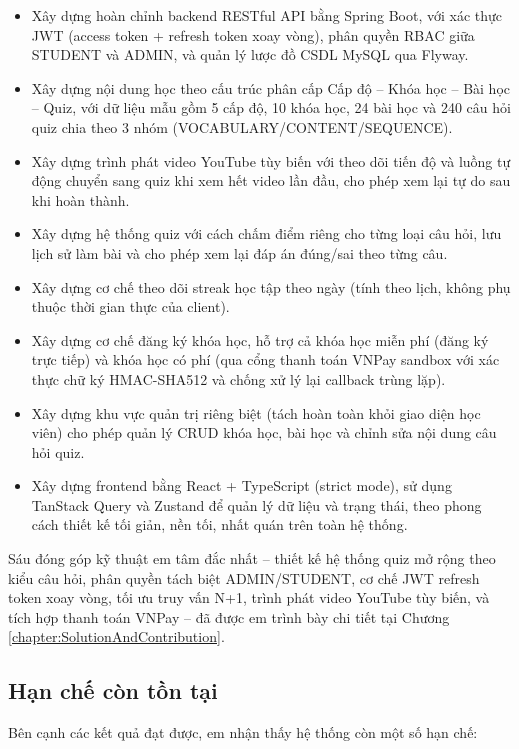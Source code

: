 \documentclass[../DoAn.tex]{subfiles}
\begin{document}
\begin{itemize}
    \item Xây dựng hoàn chỉnh backend RESTful API bằng Spring Boot, với xác thực JWT (access token + refresh token xoay vòng), phân quyền RBAC giữa STUDENT và ADMIN, và quản lý lược đồ CSDL MySQL qua Flyway.
    \item Xây dựng nội dung học theo cấu trúc phân cấp Cấp độ -- Khóa học -- Bài học -- Quiz, với dữ liệu mẫu gồm 5 cấp độ, 10 khóa học, 24 bài học và 240 câu hỏi quiz chia theo 3 nhóm (VOCABULARY/CONTENT/SEQUENCE).
    \item Xây dựng trình phát video YouTube tùy biến với theo dõi tiến độ và luồng tự động chuyển sang quiz khi xem hết video lần đầu, cho phép xem lại tự do sau khi hoàn thành.
    \item Xây dựng hệ thống quiz với cách chấm điểm riêng cho từng loại câu hỏi, lưu lịch sử làm bài và cho phép xem lại đáp án đúng/sai theo từng câu.
    \item Xây dựng cơ chế theo dõi streak học tập theo ngày (tính theo lịch, không phụ thuộc thời gian thực của client).
    \item Xây dựng cơ chế đăng ký khóa học, hỗ trợ cả khóa học miễn phí (đăng ký trực tiếp) và khóa học có phí (qua cổng thanh toán VNPay sandbox với xác thực chữ ký HMAC-SHA512 và chống xử lý lại callback trùng lặp).
    \item Xây dựng khu vực quản trị riêng biệt (tách hoàn toàn khỏi giao diện học viên) cho phép quản lý CRUD khóa học, bài học và chỉnh sửa nội dung câu hỏi quiz.
    \item Xây dựng frontend bằng React + TypeScript (strict mode), sử dụng TanStack Query và Zustand để quản lý dữ liệu và trạng thái, theo phong cách thiết kế tối giản, nền tối, nhất quán trên toàn hệ thống.
\end{itemize}

Sáu đóng góp kỹ thuật em tâm đắc nhất -- thiết kế hệ thống quiz mở rộng theo kiểu câu hỏi, phân quyền tách biệt ADMIN/STUDENT, cơ chế JWT refresh token xoay vòng, tối ưu truy vấn N+1, trình phát video YouTube tùy biến, và tích hợp thanh toán VNPay -- đã được em trình bày chi tiết tại Chương \ref{chapter:SolutionAndContribution}.

\subsection{Hạn chế còn tồn tại}

Bên cạnh các kết quả đạt được, em nhận thấy hệ thống còn một số hạn chế:
\end{document}
